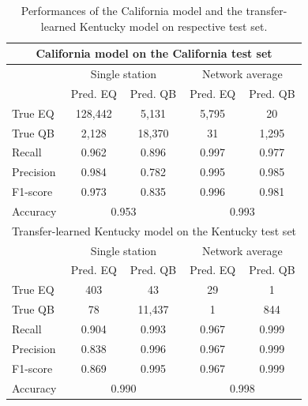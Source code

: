 \documentclass{gji}
\begin{document}
\begin{table}
\caption{Performances of the California model and the transfer-learned Kentucky model on respective test set.}
\label{socal_performance}
\begin{tabular}{lcccc}
\toprule[1pt]
\multicolumn{5}{c}{California model on the California test set}\\
\hline
&\multicolumn{2}{c}{Single station}&\multicolumn{2}{c}{Network average}\\
&Pred. EQ&Pred. QB&Pred. EQ&Pred. QB\\
True EQ&128,442&5,131&5,795&20\\
True QB&2,128&18,370&31&1,295\\
Recall&0.962&0.896&0.997&0.977\\
Precision&0.984&0.782&0.995&0.985\\
F1-score&0.973&0.835&0.996&0.981\\
Accuracy&\multicolumn{2}{c}{0.953}&\multicolumn{2}{c}{0.993}\\
\toprule[1pt]
\multicolumn{5}{c}{Transfer-learned Kentucky model on the Kentucky test set}\\
\hline
&\multicolumn{2}{c}{Single station}&\multicolumn{2}{c}{Network average}\\
&Pred. EQ&Pred. QB&Pred. EQ&Pred. QB\\
True EQ&403&43&29&1\\
True QB&78&11,437&1&844\\
Recall&0.904&0.993&0.967&0.999\\
Precision&0.838&0.996&0.967&0.999\\
F1-score&0.869&0.995&0.967&0.999\\
Accuracy&\multicolumn{2}{c}{0.990}&\multicolumn{2}{c}{0.998}\\
\bottomrule[1pt]
\end{tabular}
\end{table}
\end{document}
